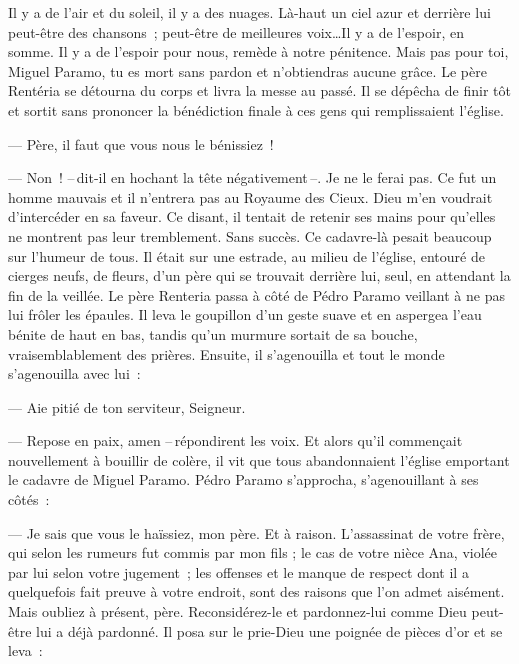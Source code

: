  \og{}Il y a de l'air et du soleil, il y a des nuages. Là-haut un ciel azur et derrière lui peut-être des chansons ; peut-être de meilleures voix\ldots Il y a de l'espoir, en somme. Il y a de l'espoir pour nous, remède à notre pénitence.
\pend
%
\pstart
  \guillemotright Mais pas pour toi, Miguel Paramo, tu es mort sans pardon et n'obtiendras aucune grâce.\fg{}
\pend
%
\pstart
  Le père Rentéria se détourna du corps et livra la messe au passé. Il se dépêcha de finir tôt et sortit sans prononcer la bénédiction finale à ces gens qui remplissaient l'église.

  --- Père, il faut que vous nous le bénissiez !

  --- Non ! --\,dit-il en hochant la tête négativement\,--. Je ne le ferai pas. Ce fut un homme mauvais et il n'entrera pas au Royaume des Cieux. Dieu m'en voudrait d'intercéder en sa faveur.
\pend
%
\pstart
  Ce disant, il tentait de retenir ses mains pour qu'elles ne montrent pas leur tremblement. Sans succès.
\pend
%
\pstart
  Ce cadavre-là pesait beaucoup sur l'humeur de tous. Il était sur une estrade, au milieu de l'église, entouré de cierges neufs, de fleurs, d'un père qui se trouvait derrière lui, seul, en attendant la fin de la veillée.
\pend
%
\pstart
  Le père Renteria passa à côté de Pédro Paramo veillant à ne pas lui frôler les épaules. Il leva le goupillon d'un geste suave et en aspergea l'eau bénite de haut en bas, tandis qu'un murmure sortait de sa bouche, vraisemblablement des prières. Ensuite, il s'agenouilla et tout le monde s'agenouilla avec lui :

  --- Aie pitié de ton serviteur, Seigneur.

  --- Repose en paix, amen --\,répondirent les voix.
\pend
%
\pstart
  Et alors qu'il commençait nouvellement à bouillir de colère, il vit que tous abandonnaient l'église emportant le cadavre de Miguel Paramo.
\pend
%
\pstart
  Pédro Paramo s'approcha, s'agenouillant à ses côtés :

  --- Je sais que vous le haïssiez, mon père. Et à raison. L'assassinat de votre frère, qui selon les rumeurs fut commis par mon fils ; le cas de votre nièce Ana, violée par lui selon votre jugement ; les offenses et le manque de respect dont il a quelquefois fait preuve à votre endroit, sont des raisons que l'on admet aisément. Mais oubliez à présent, père. Reconsidérez-le et pardonnez-lui comme Dieu peut-être lui a déjà pardonné.
\pend
%
\pstart
  Il posa sur le prie-Dieu une poignée de pièces d'or et se leva :

